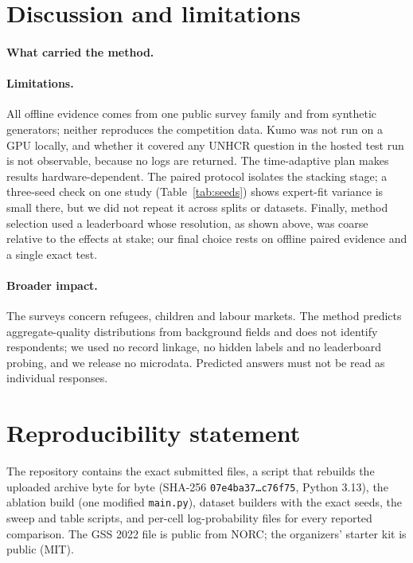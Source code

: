 \documentclass[10pt]{article}
\begin{document}
\section{Discussion and limitations}
\label{sec:discussion}

\paragraph{What carried the method.} 

\paragraph{Limitations.} All offline evidence comes from one public survey family and from synthetic generators; neither reproduces the competition data. Kumo was not run on a GPU locally, and whether it covered any UNHCR question in the hosted test run is not observable, because no logs are returned. The time-adaptive plan makes results hardware-dependent. The paired protocol isolates the stacking stage; a three-seed check on one study (Table~\ref{tab:seeds}) shows expert-fit variance is small there, but we did not repeat it across splits or datasets. Finally, method selection used a leaderboard whose resolution, as shown above, was coarse relative to the effects at stake; our final choice rests on offline paired evidence and a single exact test.

\paragraph{Broader impact.} The surveys concern refugees, children and labour markets. The method predicts aggregate-quality distributions from background fields and does not identify respondents; we used no record linkage, no hidden labels and no leaderboard probing, and we release no microdata. Predicted answers must not be read as individual responses.

\section{Reproducibility statement}
The repository contains the exact submitted files, a script that rebuilds the uploaded archive byte for byte (SHA-256 \texttt{07e4ba37\ldots c76f75}, Python 3.13), the ablation build (one modified \texttt{main.py}), dataset builders with the exact seeds, the sweep and table scripts, and per-cell log-probability files for every reported comparison. The GSS 2022 file is public from NORC; the organizers' starter kit is public (MIT).
\end{document}
